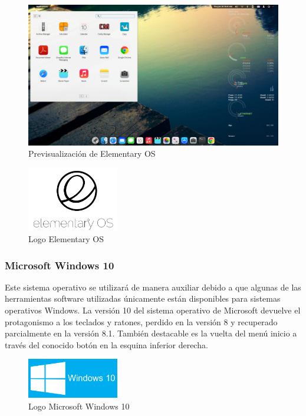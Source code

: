 	\begin{figure}[H]
	\centering
	\includegraphics[width=120mm, fbox={\fboxrule} 4mm]{images/04-metodo/11-elementary_preview.png}
	\caption{Previsualización de Elementary OS}
	\label{fig:elementary-preview}
	\end{figure}
	
	\begin{figure}[H]
	\centering
	\includegraphics[width=40mm, fbox={\fboxrule} 4mm]{images/04-metodo/12-elementary_logo.jpg}
	\caption{Logo Elementary OS}
	\label{fig:elementary-logo}
	\end{figure}
	
			\subsubsection{Microsoft Windows 10}
			Este sistema operativo se utilizará de manera auxiliar debido a que algunas de las herramientas software utilizadas únicamente están disponibles para sistemas operativos Windows.
			La versión 10 del sistema operativo de Microsoft devuelve el protagonismo a los teclados y ratones, perdido en la versión 8 y recuperado parcialmente en la versión 8.1. También destacable es la vuelta del menú inicio a través del conocido botón en la esquina inferior derecha.
			
			\begin{figure}[H]
			\centering
			\includegraphics[width=40mm, fbox={\fboxrule} 4mm]{images/04-metodo/13-windows_logo.png}
			\caption{Logo Microsoft Windows 10}
			\label{fig:windows-logo}
			\end{figure}
			

